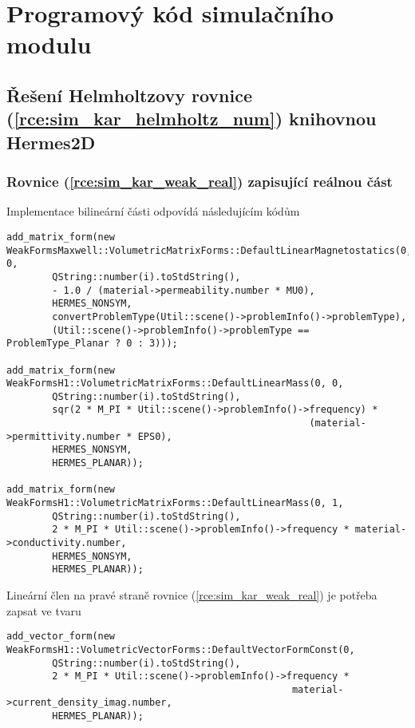 \chapter{Programový kód simulačního modulu} \label{kap:Program_kod}
\section{Řešení Helmholtzovy rovnice (\ref{rce:sim_kar_helmholtz_num}) knihovnou Hermes2D}
\subsection*{Rovnice (\ref{rce:sim_kar_weak_real}) zapisující reálnou část}
Implementace bilineární části odpovídá následujícím kódům
\begin{verbatim}
add_matrix_form(new WeakFormsMaxwell::VolumetricMatrixForms::DefaultLinearMagnetostatics(0, 0,
        QString::number(i).toStdString(),
        - 1.0 / (material->permeability.number * MU0),
        HERMES_NONSYM,
        convertProblemType(Util::scene()->problemInfo()->problemType),
        (Util::scene()->problemInfo()->problemType == ProblemType_Planar ? 0 : 3)));

add_matrix_form(new WeakFormsH1::VolumetricMatrixForms::DefaultLinearMass(0, 0,
        QString::number(i).toStdString(),
        sqr(2 * M_PI * Util::scene()->problemInfo()->frequency) *
                                                     (material->permittivity.number * EPS0),
        HERMES_NONSYM,
        HERMES_PLANAR));
  
add_matrix_form(new WeakFormsH1::VolumetricMatrixForms::DefaultLinearMass(0, 1,
        QString::number(i).toStdString(),
        2 * M_PI * Util::scene()->problemInfo()->frequency * material->conductivity.number,
        HERMES_NONSYM,
        HERMES_PLANAR));
\end{verbatim}
Lineární člen na pravé straně rovnice (\ref{rce:sim_kar_weak_real}) je potřeba zapsat ve tvaru
\begin{verbatim}
add_vector_form(new WeakFormsH1::VolumetricVectorForms::DefaultVectorFormConst(0,
        QString::number(i).toStdString(),
        2 * M_PI * Util::scene()->problemInfo()->frequency * 
                                                  material->current_density_imag.number,
        HERMES_PLANAR));
\end{verbatim}

